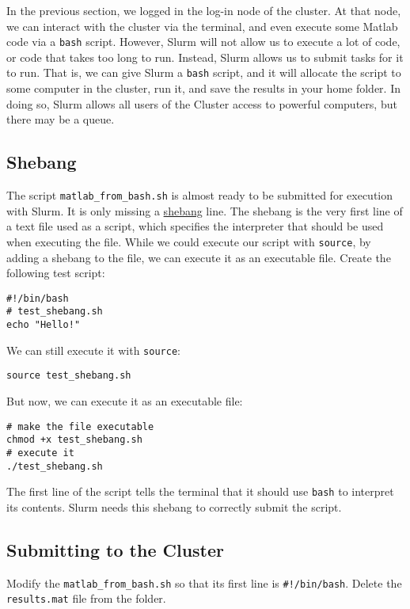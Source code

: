 \documentclass[12pt, a4paper]{article}
\begin{document}
In the previous section, we logged in the log-in node of the cluster.
At that node, we can interact with the cluster via the terminal, and even execute some Matlab code via a \texttt{bash} script.
However, Slurm will not allow us to execute a lot of code, or code that takes too long to run.
Instead, Slurm allows us to submit tasks for it to run.
That is, we can give Slurm a \texttt{bash} script, and it will allocate the script to some computer in the cluster, run it, and save the results in your home folder.
In doing so, Slurm allows all users of the Cluster access to powerful computers, but there may be a queue.
\subsection{Shebang}
\label{sec:orga6d4257}
The script \texttt{matlab\_from\_bash.sh} is almost ready to be submitted for execution with Slurm.
It is only missing a \href{https://en.wikipedia.org/wiki/Shebang\_(Unix)}{shebang} line.
The shebang is the very first line of a text file used as a script, which specifies the interpreter that should be used when executing the file.
While we could execute our script with \texttt{source}, by adding a shebang to the file, we can execute it as an executable file.
Create the following test script:
\lstset{language=bash,label= ,caption= ,captionpos=b,firstnumber=1,numbers=left,style=bash}
\begin{lstlisting}
#!/bin/bash
# test_shebang.sh
echo "Hello!"
\end{lstlisting}
We can still execute it with \texttt{source}:
\lstset{language=bash,label= ,caption= ,captionpos=b,firstnumber=1,numbers=left,style=bash}
\begin{lstlisting}
source test_shebang.sh
\end{lstlisting}
But now, we can execute it as an executable file:
\lstset{language=bash,label= ,caption= ,captionpos=b,firstnumber=1,numbers=left,style=bash}
\begin{lstlisting}
# make the file executable
chmod +x test_shebang.sh
# execute it
./test_shebang.sh
\end{lstlisting}
The first line of the script tells the terminal that it should use \texttt{bash} to interpret its contents.
Slurm needs this shebang to correctly submit the script.
\subsection{Submitting to the Cluster}
\label{sec:orgb60eea2}
Modify the \texttt{matlab\_from\_bash.sh} so that its first line is \texttt{\#!/bin/bash}.
Delete the \texttt{results.mat} file from the folder.
\end{document}
